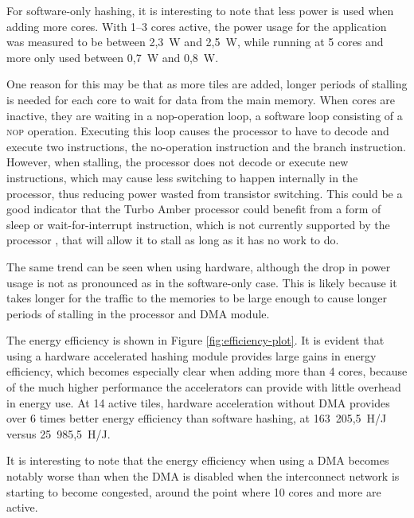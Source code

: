 For software-only hashing, it is interesting to note that less power is used when adding more cores. With 1--3 cores
active, the power usage for the application was measured to be between 2,3~W and 2,5~W, while running at 5 cores and
more only used between 0,7~W and 0,8~W.

One reason for this may be that as more tiles are added, longer periods of stalling is needed for each core to wait for data from
the main memory. When cores are inactive, they are waiting in a nop-operation loop, a software loop consisting of a
\textsc{nop} operation. Executing this loop causes the processor to have to decode and execute two instructions,
the no-operation instruction and the branch instruction. However, when stalling, the processor does not decode or
execute new instructions, which may cause less switching to happen internally in the processor, thus reducing power
wasted from transistor switching. This could be a good indicator that the Turbo Amber processor could benefit
from a form of sleep or wait-for-interrupt instruction, which is not currently supported by the processor \cite{amber-spec}, that will
allow it to stall as long as it has no work to do.

The same trend can be seen when using hardware, although the drop in power usage is not as pronounced as in the software-only
case. This is likely because it takes longer for the traffic to the memories to be large enough to cause longer periods of
stalling in the processor and DMA module.

The energy efficiency is shown in Figure \ref{fig:efficiency-plot}. It is evident that using a hardware accelerated
hashing module provides large gains in energy efficiency, which becomes especially clear when adding more than 4 cores,
because of the much higher performance the accelerators can provide with little overhead in energy use. At 14 active
tiles, hardware acceleration without DMA provides over 6 times better energy efficiency than software hashing,
at 163~205,5~H/J versus 25~985,5~H/J.

It is interesting to note that the energy efficiency when using a DMA becomes notably worse than when the DMA is disabled
when the interconnect network is starting to become congested, around the point where 10 cores and more are active.


